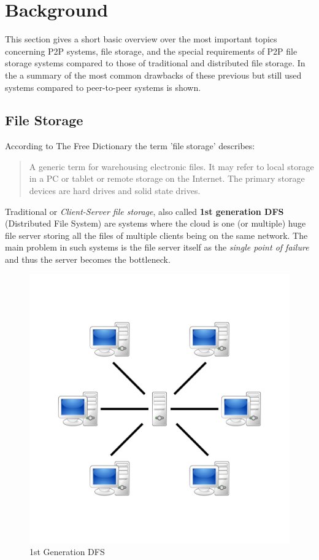 \section{Background} %
\label{sec:background}
This section gives a short basic overview over the most important topics concerning P2P systems, file storage, and the special requirements of P2P file storage systems compared to those of traditional and distributed file storage. In the a summary of the most common drawbacks of these previous but still used systems compared to peer-to-peer systems is shown.

\subsection{File Storage}
According to The Free Dictionary\cite{thefreedictionary} the term 'file storage' describes:
\begin{quote}
A generic term for warehousing electronic files. It may refer to local storage in a PC or tablet or remote storage on the Internet. The primary storage devices are hard drives and solid state drives.
\end{quote}

Traditional or \textit{Client-Server file storage}, also called \textbf{1st generation DFS} (Distributed File System) are systems where the cloud is one (or multiple) huge file server storing all the files of multiple clients being on the same network. The main problem in such systems is the file server itself as the \textit{single point of failure} and thus the server becomes the bottleneck.

	\begin{figure}[H]
		\begin{center}
		\includegraphics[scale=0.2]{Talk5/1st_gen_dfs.PNG}
		\end{center}
		\caption{1st Generation DFS \cite{wikimedia:p2p}}
		\label{1st_gen_dfs}
	\end{figure}

